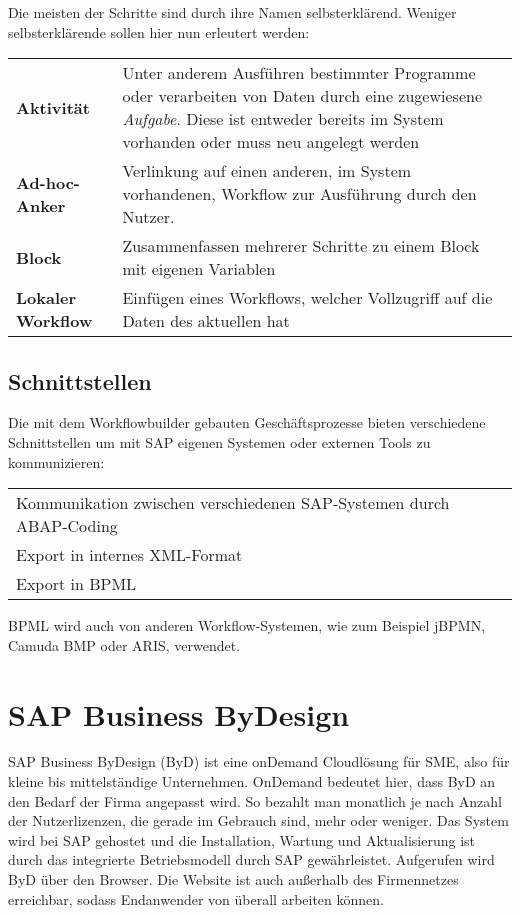 \documentclass{handout}
\begin{document}
Die meisten der Schritte sind durch ihre Namen selbsterklärend. Weniger selbsterklärende sollen hier nun erleutert werden:

\small
\begin{tabular}{l p{13 cm}}
\textbf{Aktivität} & Unter anderem Ausführen bestimmter Programme oder verarbeiten von Daten durch eine zugewiesene \textit{Aufgabe}. Diese ist entweder bereits im System vorhanden oder muss neu angelegt werden\\
\textbf{Ad-hoc-Anker} & Verlinkung auf einen anderen, im System vorhandenen, Workflow zur Ausführung durch den Nutzer.\\
\textbf{Block} & Zusammenfassen mehrerer Schritte zu einem Block mit eigenen Variablen\\
\textbf{Lokaler Workflow} & Einfügen eines Workflows, welcher Vollzugriff auf die Daten des aktuellen hat\\
\end{tabular}
\normalsize

\subsection{Schnittstellen}

Die mit dem Workflowbuilder gebauten Geschäftsprozesse bieten verschiedene Schnittstellen um mit SAP eigenen Systemen oder externen Tools zu kommunizieren:

\small
\begin{tabular}{L l}
Kommunikation zwischen verschiedenen SAP-Systemen durch ABAP-Coding\\
Export in internes XML-Format\\
Export in BPML\\
\end{tabular}
\normalsize

BPML wird auch von anderen Workflow-Systemen, wie zum Beispiel jBPMN, Camuda BMP oder ARIS, verwendet.

\section{SAP Business ByDesign}

SAP Business ByDesign (ByD) ist eine onDemand Cloudlösung für SME, also für kleine bis mittelständige Unternehmen. OnDemand bedeutet hier, dass ByD an den Bedarf der Firma angepasst wird. So bezahlt man monatlich je nach Anzahl der Nutzerlizenzen, die gerade im Gebrauch sind, mehr oder weniger. Das System wird bei SAP gehostet und die Installation, Wartung und Aktualisierung ist durch das integrierte Betriebsmodell durch SAP gewährleistet. Aufgerufen wird ByD über den Browser. Die Website ist auch außerhalb des Firmennetzes erreichbar, sodass Endanwender von überall arbeiten können.
\end{document}
